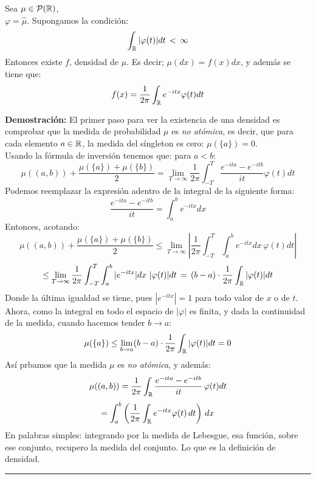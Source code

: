 \begin{teorema} Sea $\mu\in\mathcal{P}(\mathbb R)$, \\$\varphi = \hat{\mu}$. Supongamos la condición:
\[\int_{\mathbb R}|\varphi (t)|dt\,<\,\infty\]
Entonces existe $f$, densidad de $\mu$. Es decir; $\mu(dx) = f(x)dx$, y además se tiene que:
\[f(x) = \frac{1}{2\pi}\int_{\mathbb R}e^{-itx}\varphi (t) dt\]
\end{teorema}
\textbf{Demostración: }El primer paso para ver la existencia de una densidad es comprobar que la medida de probabilidad $\mu$ es \textit{no atómica}, es decir, que para cada elemento $a\in\mathbb R$, la medida del síngleton es cero: $\mu(\{a\})=0$.\\
Usando la fórmula de inversión tenemos que: para $a<b$:
\[\mu((a,b)) + \frac{\mu(\{a\})+\mu(\{b\})}{2} = \lim_{T\to\infty} \frac{1}{2\pi}\int_{-T}^{T}\frac{e^{-ita}-e^{-itb}}{it}\varphi(t)dt\]
Podemos reemplazar la expresión adentro de la integral de la siguiente forma:
\[\frac{e^{-ita}-e^{-itb}}{it} = \int_{a}^{b}e^{-itx}dx\]
Entonces, acotando:
\[\mu((a,b)) + \frac{\mu(\{a\})+\mu(\{b\})}{2} \leq \lim_{T\to\infty} \left|\frac{1}{2\pi}\int_{-T}^{T}\int_{a}^{b}e^{-itx}dx\,\varphi(t)dt\right|\]
\[\leq \lim_{T\rightarrow\infty}\frac{1}{2\pi}\int_{-T}^{T}\int_{a}^{b}|e^{-itx}|dx\,\,|\varphi(t)|dt \,=\,(b-a)\cdot \frac{1}{2\pi}\int_{\mathbb R}|\varphi(t)|dt\]
Donde la última igualdad se tiene, pues $|e^{-itx}|=1$ para todo valor de $x$ o de $t$. Ahora, como la integral en todo el espacio de $|\varphi|$ es finita, y dada la continuidad de la medida, cuando hacemos tender $b\rightarrow a$:
\[\mu(\{a\}) \leq \lim_{b\rightarrow a} (b-a)\cdot \frac{1}{2\pi}\int_{\mathbb R}|\varphi(t)|dt = 0\]
Así prbamos que la medida $\mu$ es \textit{no atómica}, y además:
\[\mu((a,b)) = \frac{1}{2\pi}\int_{\mathbb R}\frac{e^{-ita}-e^{-itb}}{it}\,\varphi(t)dt\]
\[= \int_{a}^{b}\left(\frac{1}{2\pi}\int_{\mathbb R}e^{-itx}\varphi(t)\,dt\right)\,dx\]
En palabras simples: integrando por la medida de Lebesgue, esa función, sobre ese conjunto, recupero la medida del conjunto. Lo que es la definición de densidad.
\rule{0.7em}{0.7em}\\ \newline

